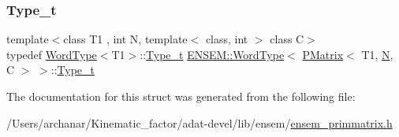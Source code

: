 \mbox{\label{structENSEM_1_1WordType_3_01PMatrix_3_01T1_00_01N_00_01C_01_4_01_4_a892bcf86195d7872e78b5a8b6a1e1734}} 
\subsubsection{\texorpdfstring{Type\_t}{Type\_t}\hspace{0.1cm}{\footnotesize\ttfamily [3/3]}}
{\footnotesize\ttfamily template$<$class T1 , int N, template$<$ class, int $>$ class C$>$ \\
typedef \mbox{\hyperlink{structENSEM_1_1WordType}{Word\+Type}}$<$T1$>$\+::\mbox{\hyperlink{structENSEM_1_1WordType_3_01PMatrix_3_01T1_00_01N_00_01C_01_4_01_4_a892bcf86195d7872e78b5a8b6a1e1734}{Type\+\_\+t}} \mbox{\hyperlink{structENSEM_1_1WordType}{E\+N\+S\+E\+M\+::\+Word\+Type}}$<$ \mbox{\hyperlink{classENSEM_1_1PMatrix}{P\+Matrix}}$<$ T1, \mbox{\hyperlink{adat__devel_2lib_2hadron_2operator__name__util_8cc_a7722c8ecbb62d99aee7ce68b1752f337}{N}}, C $>$ $>$\+::\mbox{\hyperlink{structENSEM_1_1WordType_3_01PMatrix_3_01T1_00_01N_00_01C_01_4_01_4_a892bcf86195d7872e78b5a8b6a1e1734}{Type\+\_\+t}}}



The documentation for this struct was generated from the following file\+:\begin{DoxyCompactItemize}
\item 
/\+Users/archanar/\+Kinematic\+\_\+factor/adat-\/devel/lib/ensem/\mbox{\hyperlink{adat-devel_2lib_2ensem_2ensem__primmatrix_8h}{ensem\+\_\+primmatrix.\+h}}\end{DoxyCompactItemize}

